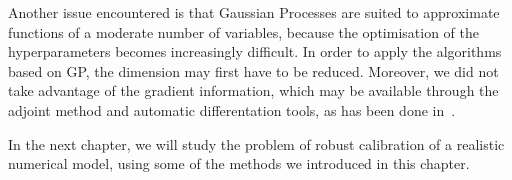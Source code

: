\documentclass[../../Main_ManuscritThese.tex]{subfiles}
\begin{document}
Another issue encountered is that Gaussian Processes are suited to
approximate functions of a moderate number of variables, because the
optimisation of the hyperparameters becomes increasingly difficult. In
order to apply the algorithms based on GP, the dimension may first
have to be reduced. Moreover, we did not take advantage of the
gradient information, which may be available through the adjoint
method and automatic differentation tools, as has been done
in~\cite{bouhlel_gradient-enhanced_2019,laurent_overview_2019,miranda_adjoint-based_2016,pardalos_differentiating_2015}.

In the next chapter, we will study the problem of robust calibration
of a realistic numerical model, using some of the methods we
introduced in this chapter.


\markchapterend

\subfileLocal{
	\pagestyle{empty}
	
	
}
\end{document}
